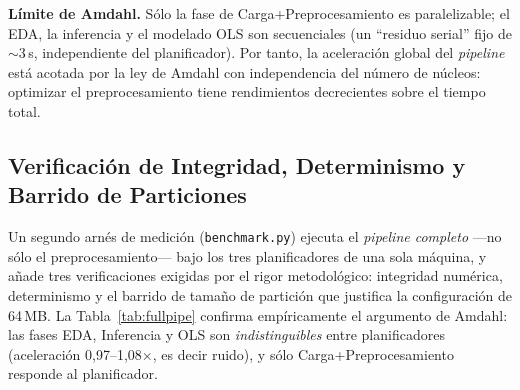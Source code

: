 \documentclass[12pt,letterpaper]{article}
\begin{document}
\noindent\textbf{Límite de Amdahl.} Sólo la fase de Carga+Preprocesamiento es paralelizable; el EDA,
la inferencia y el modelado OLS son secuenciales (un ``residuo serial'' fijo de $\sim$3\,s,
independiente del planificador). Por tanto, la aceleración global del \textit{pipeline} está acotada
por la ley de Amdahl con independencia del número de núcleos: optimizar el preprocesamiento tiene
rendimientos decrecientes sobre el tiempo total.

\subsection{Verificación de Integridad, Determinismo y Barrido de Particiones}
\label{sec:verificacion}
Un segundo arnés de medición (\texttt{benchmark.py}) ejecuta el \textit{pipeline completo}
—no sólo el preprocesamiento— bajo los tres planificadores de una sola máquina, y añade tres
verificaciones exigidas por el rigor metodológico: integridad numérica, determinismo y el barrido
de tamaño de partición que justifica la configuración de 64\,MB. La Tabla~\ref{tab:fullpipe} confirma
empíricamente el argumento de Amdahl: las fases EDA, Inferencia y OLS son \textit{indistinguibles}
entre planificadores (aceleración 0,97--1,08$\times$, es decir ruido), y sólo Carga+Preprocesamiento
responde al planificador.

\begin{table}[H]
\centering
{}
\caption{Tiempo del \textit{pipeline} completo por fase (media $\pm$ desv.\ de 3 ejecuciones, en
segundos). Los tiempos absolutos difieren de la Tabla~\ref{tab:benchmark} (medida en otra sesión) por
la variabilidad térmica/de carga de la máquina entre ejecuciones (hasta $\sim$15\%); las
\textbf{razones de aceleración y las conclusiones son invariantes} (\texttt{threads} $\approx$1,3$\times$,
\texttt{processes} $\approx$0,3$\times$), como también lo son la integridad y el determinismo.}
\label{tab:fullpipe}
\end{table}
\end{document}
